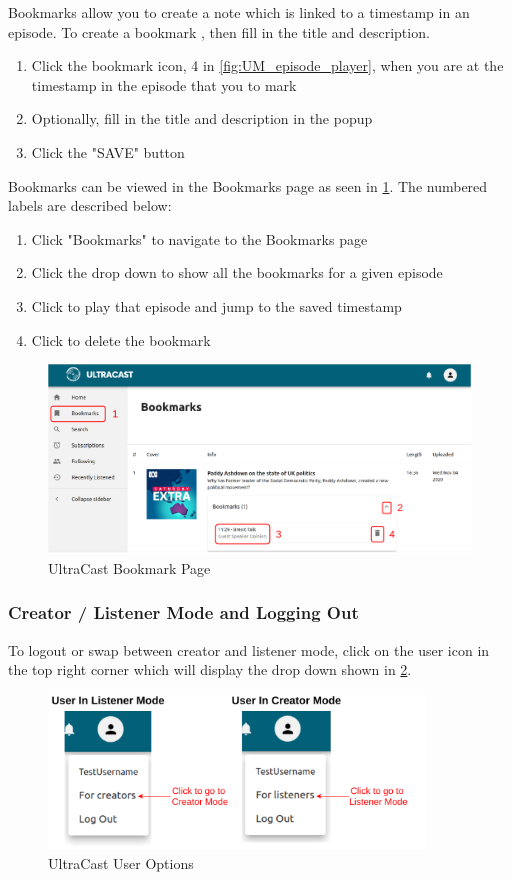\documentclass[../report.tex]{subfiles}
\begin{document}
Bookmarks allow you to create a note which is linked to a timestamp in an episode. To create a bookmark , then fill in the title and description. 
\begin{enumerate}
    \item Click the bookmark icon, 4 in \cref{fig:UM_episode_player}, when you are at the timestamp in the episode that you to mark
    \item Optionally, fill in the title and description in the popup
    \item Click the "SAVE" button
\end{enumerate}
%
Bookmarks can be viewed in the Bookmarks page as seen in \cref{fig:UM_bookmark}. The numbered labels are described below:
\begin{enumerate}
    \item Click "Bookmarks" to navigate to the Bookmarks page
    \item Click the drop down to show all the bookmarks for a given episode
    \item Click to play that episode and jump to the saved timestamp
    \item Click to delete the bookmark
\end{enumerate}
\begin{figure}[ht]
    \centering
    \includegraphics[width=16cm]{resources/UM_Bookmark}
    \caption{UltraCast Bookmark Page}
    \label{fig:UM_bookmark} 
\end{figure}

\newpage

\subsubsection{Creator / Listener Mode and Logging Out} \label{sssec:user_modes}
To logout or swap between creator and listener mode, click on the user icon in the top right corner
which will display the drop down shown in \cref{fig:UM_user_options}.
\begin{figure}[ht]
    \centering
    \includegraphics[width=10cm]{resources/UM_CLL}
    \caption{UltraCast User Options}
    \label{fig:UM_user_options} 
\end{figure}
\end{document}
